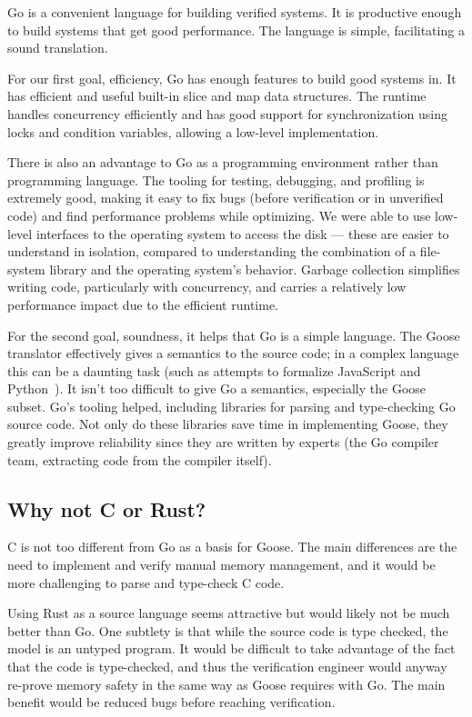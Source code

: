 Go is a convenient language for building verified systems. It is productive
enough to build systems that get good performance. The language is simple,
facilitating a sound translation.

For our first goal, efficiency, Go has enough features to build good systems
in. It has efficient and useful built-in slice and map data structures. The
runtime handles concurrency efficiently and has good support for synchronization
using locks and condition variables, allowing a low-level implementation.

There is also an advantage to Go as a programming environment rather than
programming language. The tooling for testing, debugging, and profiling is
extremely good, making it easy to fix bugs (before verification or in unverified
code) and find performance problems while optimizing. We were able to use
low-level interfaces to the operating system to access the disk --- these are
easier to understand in isolation, compared to understanding the combination of
a file-system library and the operating system's behavior. Garbage collection
simplifies writing code, particularly with concurrency, and carries a relatively
low performance impact due to the efficient runtime.

For the second goal, soundness, it helps that Go is a simple language. The Goose
translator effectively gives a semantics to the source code; in a complex
language this can be a daunting task (such as attempts to formalize JavaScript and
Python~\cite{guha:lambda-js,politz:python-semantics}). It isn't too
difficult to give Go a semantics, especially the Goose subset. Go's tooling
helped, including libraries for parsing and type-checking Go source code. Not
only do these libraries save time in implementing Goose, they greatly improve
reliability since they are written by experts (the Go compiler team, extracting
code from the compiler itself).

\subsection{Why not C or Rust?}

C is not too different from Go as a basis for Goose. The main differences are
the need to implement and verify manual memory management, and it would be more
challenging to parse and type-check C code.

Using Rust as a source language seems attractive but would likely not be much
better than Go. One subtlety is that while the source code is type checked, the
model is an untyped program. It would be difficult to take advantage of the fact
that the code is type-checked, and thus the verification engineer would anyway
re-prove memory safety in the same way as Goose requires with Go. The main
benefit would be reduced bugs before reaching verification.

